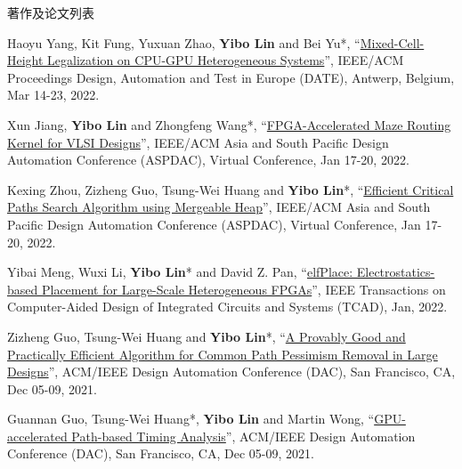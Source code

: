 \begin{rSection}{著作及论文列表}
\begin{description}[font=\normalfont, rightmargin=2em]
{}
            

\item[{[C87]}]{
        Haoyu Yang, Kit Fung, Yuxuan Zhao, \textbf{Yibo Lin} and Bei Yu*, 
    ``\href{https://doi.org/10.23919/DATE54114.2022.9774671}{Mixed-Cell-Height Legalization on CPU-GPU Heterogeneous Systems}'', 
    IEEE/ACM Proceedings Design, Automation and Test in Europe (DATE), Antwerp, Belgium, Mar 14-23, 2022.
    
}
            

\item[{[C86]}]{
        Xun Jiang, \textbf{Yibo Lin} and Zhongfeng Wang*, 
    ``\href{https://doi.org/10.1109/ASP-DAC52403.2022.9712533}{FPGA-Accelerated Maze Routing Kernel for VLSI Designs}'', 
    IEEE/ACM Asia and South Pacific Design Automation Conference (ASPDAC), Virtual Conference, Jan 17-20, 2022.
    
}
            

\item[{[C85]}]{
        Kexing Zhou, Zizheng Guo, Tsung-Wei Huang and \textbf{Yibo Lin}*, 
    ``\href{https://doi.org/10.1109/ASP-DAC52403.2022.9712566}{Efficient Critical Paths Search Algorithm using Mergeable Heap}'', 
    IEEE/ACM Asia and South Pacific Design Automation Conference (ASPDAC), Virtual Conference, Jan 17-20, 2022.
    
}
            

\item[{[J84]}]{
        Yibai Meng, Wuxi Li, \textbf{Yibo Lin}* and David Z. Pan, 
    ``\href{https://doi.org/10.1109/TCAD.2021.3053191}{elfPlace: Electrostatics-based Placement for Large-Scale Heterogeneous FPGAs}'', 
    IEEE Transactions on Computer-Aided Design of Integrated Circuits and Systems (TCAD), Jan, 2022.
    
}
            

\item[{[C83]}]{
        Zizheng Guo, Tsung-Wei Huang and \textbf{Yibo Lin}*, 
    ``\href{https://doi.org/10.1109/DAC18074.2021.9586085}{A Provably Good and Practically Efficient Algorithm for Common Path Pessimism Removal in Large Designs}'', 
    ACM/IEEE Design Automation Conference (DAC), San Francisco, CA, Dec 05-09, 2021.
    
}
            

\item[{[C82]}]{
        Guannan Guo, Tsung-Wei Huang*, \textbf{Yibo Lin} and Martin Wong, 
    ``\href{https://doi.org/10.1109/DAC18074.2021.9586316}{GPU-accelerated Path-based Timing Analysis}'', 
    ACM/IEEE Design Automation Conference (DAC), San Francisco, CA, Dec 05-09, 2021.
    
}
\end{description}
\end{rSection}
